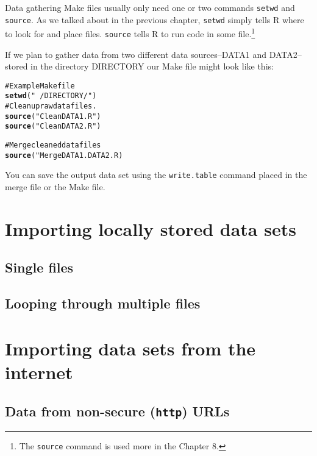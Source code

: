 \documentclass[ChapterTOCs,krantz1]{krantz}\usepackage{graphicx, color}
\makeatletter
\newcommand{\hlfunctioncall}[1]{\textcolor[rgb]{0.501960784313725,0,0.329411764705882}{\textbf{#1}}}%
\newcommand{\hlstring}[1]{\textcolor[rgb]{0.6,0.6,1}{#1}}%
\newcommand{\hlcomment}[1]{\textcolor[rgb]{0.180392156862745,0.6,0.341176470588235}{#1}}%
\newenvironment{kframe}{%
 \def\at@end@of@kframe{}%
 \ifinner\ifhmode%
  \def\at@end@of@kframe{\end{minipage}}%
  \begin{minipage}{\columnwidth}%
 \fi\fi%
 \def\FrameCommand##1{\hskip\@totalleftmargin \hskip-\fboxsep
 \colorbox{shadecolor}{##1}\hskip-\fboxsep
     \hskip-\linewidth \hskip-\@totalleftmargin \hskip\columnwidth}%
 \MakeFramed {\advance\hsize-\width
   \@totalleftmargin\z@ \linewidth\hsize
   \@setminipage}}%
 {\par\unskip\endMakeFramed%
 \at@end@of@kframe}
\newenvironment{knitrout}{}{} %
\makeatother
\begin{document}
Data gathering Make files usually only need one or two commands {\tt{setwd}} and {\tt{source}}. As we talked about in the previous chapter, {\tt{setwd}} simply tells R where to look for and place files. {\tt{source}} tells R to run code in some file.\footnote{The {\tt{source}} command is used more in the Chapter 8.} 

If we plan to gather data from two different data sources--DATA1 and DATA2--stored in the directory DIRECTORY our Make file might look like this:

\begin{knitrout}
\color{fgcolor}\begin{kframe}
\begin{alltt}
\hlcomment{# Example Make file}
\hlfunctioncall{setwd}(\hlstring{"~/DIRECTORY/"})
\hlcomment{# Clean up raw data files.}
\hlfunctioncall{source}(\hlstring{"CleanDATA1.R"})
\hlfunctioncall{source}(\hlstring{"CleanDATA2.R"})
    
\hlcomment{# Merge cleaned data files}
\hlfunctioncall{source}("MergeDATA1.DATA2.R)
\end{alltt}
\end{kframe}
\end{knitrout}


You can save the output data set using the {\tt{write.table}} command placed in the merge file or the Make file.

\section{Importing locally stored data sets}

\subsection{Single files}

\subsection{Looping through multiple files}

\section{Importing data sets from the internet}

\subsection{Data from non-secure ({\tt{http}}) URLs}
\end{document}
